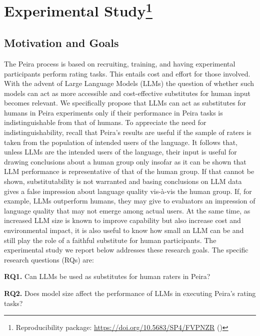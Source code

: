 \section[Experimental Study]{Experimental Study\protect\footnote{Reproducibility package: \url{https://doi.org/10.5683/SP4/FVPNZR} (\cite{TR})}}\label{sec:study}

\subsection{Motivation and Goals}

The Peira process is based on recruiting, training, and having experimental participants perform rating tasks. This entails cost and effort for those involved. With the advent of Large Language Models (LLMs) \cite{LLM.survey} the question of whether such models can act as more accessible and cost-effective substitutes for human input becomes relevant. We specifically propose that LLMs can act as substitutes for humans in Peira experiments only if their performance in Peira tasks is indistinguishable from that of humans. To appreciate the need for indistinguishability, recall that Peira's results are useful if the sample of raters is taken from the population of intended users of the language. It follows that, unless LLMs are the intended users of the language, their input is useful for drawing conclusions about a human group only insofar as it can be shown that LLM performance is representative of that of the human group. If that cannot be shown, substitutability is not warranted and basing conclusions on LLM data gives a false impression about language quality vis-\`{a}-vis the human group. If, for example, LLMs outperform humans, they may give to evaluators an impression of language quality that may not emerge among actual users. At the same time, as increased LLM size is known to improve capability but also increase cost and environmental impact, it is also useful to know how small an LLM can be and still play the role of a faithful substitute for human participants. The experimental study we report below addresses these research goals. The specific research questions (RQs) are:

\textbf{RQ1.} Can LLMs be used as substitutes for human raters in Peira?

\textbf{RQ2.} Does model size affect the performance of LLMs in executing Peira's rating tasks?

